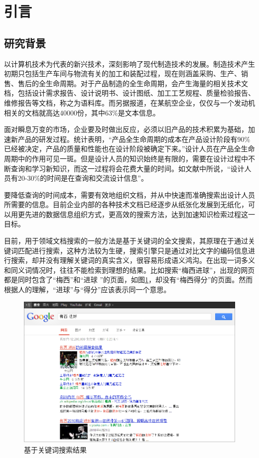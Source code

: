 \documentclass[12pt,a4paper]{article}
\newcommand{\wuhao}{\fontsize{10.5pt}{\baselineskip}\selectfont}
\begin{document}
\newpage
\makeatletter %
\setlength{\baselineskip}{20pt} %
\setlength{\parskip}{0pt}
\section{引言} 
	\subsection{研究背景}
	以计算机技术为代表的新兴技术，深刻影响了现代制造技术的发展。制造技术产生初期只包括生产车间与物流有关的加工和装配过程，现在则涵盖采购、生产、销售、售后的全生命周期。对于产品制造的全生命周期，会产生海量的相关技术文档，包括设计需求报告、设计说明书、设计图纸、加工工艺规程、质量检验报告、维修报告等文档，称之为语料库。而另据报道，在某航空企业，仅仅与一个发动机相关的文档就高达40000份，其中63\%是文本信息\cite{1}。 
   
	面对瞬息万变的市场，企业要及时做出反应，必须以旧产品的技术积累为基础，加速新产品的研发过程。统计表明，“产品全生命周期的成本在产品设计阶段有90\%已经被决定，产品的质量和性能也在设计阶段被确定下来。”\cite{2}设计人员在产品全生命周期中的作用可见一斑。但是设计人员的知识始终是有限的，需要在设计过程中不断查询和学习新知识，而这一过程将会花费大量的时间。如文献\cite{1}中所说，“设计人员有20-30\%的时间是在查询和交流设计信息”。
   
	要降低查询的时间成本，需要有效地组织文档，并从中快速而准确搜索出设计人员所需要的信息。目前企业内部的各种技术文档已经逐步从纸张化发展到无纸化，可以用更先进的数据信息组织方式，更高效的搜索方法，达到加速知识检索过程这一目标。
   
	目前，用于领域文档搜索的一般方法是基于关键词的全文搜索，其原理在于通过关键词匹配进行搜索，这种方法较为生硬，搜索引擎只是通过对比文字的编码信息进行搜索，却并没有理解关键词的真实含义，很容易形成语义鸿沟。在出现一词多义和同义词情况时，往往不能检索到理想的结果。比如搜索“梅西进球”，出现的网页都是同时包含了“梅西”和“进球 ”的页面，如图{\ref{fig:queryExample}}，却没有“梅西得分”的页面。然而根据人的理解，“进球”与“得分”应该表示同一个意思。
   
	\begin{figure}[htbp] 
	\centering\includegraphics[width=5in]{queryExample.png} 
	\caption{\wuhao 基于关键词搜索结果}\label{fig:queryExample} 
	\end{figure} 
   
\end{document}
